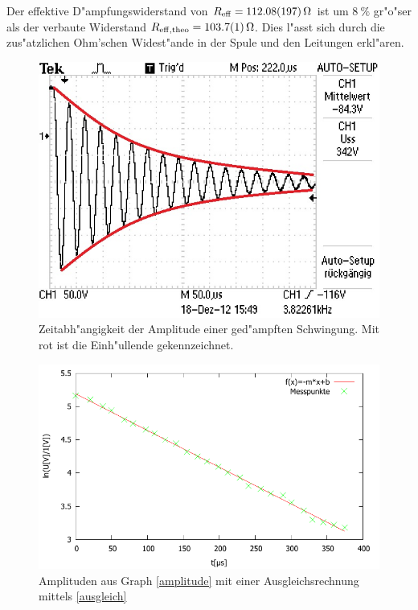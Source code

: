 	Der effektive D"ampfungswiderstand von $R_\mathrm{eff} = \SI{112.08 (197)}{\ohm}$ ist um $\SI{8}{\%}$ gr"o"ser als der verbaute Widerstand $R_\mathrm{eff,theo} = \SI{103.7 (1)}{\ohm}$. Dies l"asst sich durch die zus"atzlichen Ohm'schen Widest"ande in der Spule und den Leitungen erkl"aren.

	\clearpage

	\begin{figure}[!h]
		\centering
		\includegraphics[width = 12cm]{img/F0006TEK.jpg}
		\caption{Zeitabh"angigkeit der Amplitude einer ged"ampften Schwingung. Mit rot ist die Einh"ullende gekennzeichnet.}
		\label{amplitude}
	\end{figure}

	\begin{figure}[!h]
		\centering
		\includegraphics[width = 12cm]{img/graph_a_2.pdf}
		\caption{Amplituden aus Graph \eqref{amplitude} mit einer Ausgleichsrechnung mittels \eqref{ausgleich}}
		\label{amplitude_fit}
	\end{figure}

